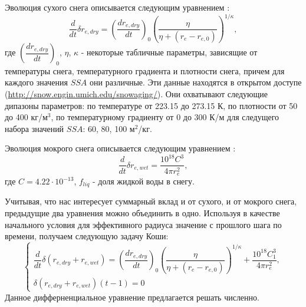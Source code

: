\documentclass[a4paper, fontsize=14pt]{scrartcl}
\begin{document}
Эволюция сухого снега описывается следующим уравнением \cite{Flanner2007, CLM4.5tech}:
\begin{equation}
    \dfrac{d}{dt} \delta r_{e , dry} = {\left( \dfrac{dr_{e , dry}}{dt} \right)}_0 \left(\dfrac{\eta}{\eta + (r_e - r_{e, 0})}\right)^{1 / \kappa}, \label{sys}
\end{equation}
где ${\left( \dfrac{dr_{e , dry}}{dt} \right)}_0$, $\eta$, $\kappa$ - некоторые табличные параметры, зависящие от температуры снега, температурного градиента и плотности снега, причем для каждого значения $SSA$ они различные. Эти данные находятся в открытом доступе (\url{http://snow.engin.umich.edu/snowaging/}). Они охватывают следующие дипазоны параметров: по температуре от 223.15 до 273.15 К, по плотности от 50 до 400 кг/м$^3$, по температурному градиенту от 0 до 300 К/м для следущего набора значений $SSA$: 60, 80, 100 м$^2$/кг.

Эволюция мокрого снега описывается следующим уравнением \cite{CLM4.5tech}:
\begin{equation}
\dfrac{d}{dt} \delta r_{e , wet} = \dfrac{10^{18} C ^3} {4 \pi r_{e}^2}, \label{sys}
\end{equation}
где $C = 4.22 \cdot 10^{-13}$, $f_{liq}$ - доля жидкой воды в снегу.

Учитывая, что нас интересует суммарный вклад и от сухого, и от мокрого снега, предыдущие два уравнения можно объединить в одно. Используя в качестве начального условия для эффективного радиуса значение с прошлого шага по времени, получаем следующую задачу Коши:
\begin{equation}
    \begin{cases}
        \dfrac{d}{dt} \delta (r_{e , dry} + r_{e , wet}) = {\left( \dfrac{dr_{e , dry}}{dt} \right)}_0 \left(\dfrac{\eta}{\eta + (r_e - r_{e, 0})}\right)^{1 / \kappa} + \dfrac{10^{18} C_1 ^3} {4 \pi r_{e}^2} ,
        \\
        \delta (r_{e , dry} + r_{e , wet})(t-1) = 0
    \end{cases} \label{sys}
\end{equation}
Данное дифферненциальное уравнение предлагается решать численно.
\end{document}
